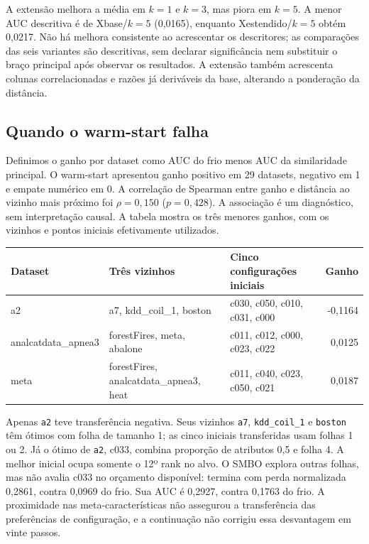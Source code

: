 \documentclass[10pt,a4paper]{article}
\begin{document}
A extensão melhora a média em $k=1$ e $k=3$, mas piora em $k=5$. A menor AUC descritiva é de Xbase/$k=5$ (0,0165), enquanto Xestendido/$k=5$ obtém 0,0217. Não há melhora consistente ao acrescentar os descritores; as comparações das seis variantes são descritivas, sem declarar significância nem substituir o braço principal após observar os resultados. A extensão também acrescenta colunas correlacionadas e razões já deriváveis da base, alterando a ponderação da distância.

\subsection{Quando o warm-start falha}
Definimos o ganho por dataset como AUC do frio menos AUC da similaridade principal. O warm-start apresentou ganho positivo em 29 datasets, negativo em 1 e empate numérico em 0. A correlação de Spearman entre ganho e distância ao vizinho mais próximo foi $\rho=0,150$ ($p=0,428$). A associação é um diagnóstico, sem interpretação causal. A tabela mostra os três menores ganhos, com os vizinhos e pontos iniciais efetivamente utilizados.

\begin{center}\scriptsize
\begin{tabularx}{\linewidth}{lYYr}
\toprule
Dataset & Três vizinhos & Cinco configurações iniciais & Ganho \\
\midrule
a2 & a7, kdd\_coil\_1, boston & c030, c050, c010, c031, c000 & -0,1164 \\
analcatdata\_apnea3 & forestFires, meta, abalone & c011, c012, c000, c023, c022 & 0,0125 \\
meta & forestFires, analcatdata\_apnea3, heat & c011, c040, c023, c050, c021 & 0,0187 \\
\bottomrule
\end{tabularx}
\end{center}

Apenas \texttt{a2} teve transferência negativa. Seus vizinhos \texttt{a7}, \texttt{kdd\_coil\_1} e \texttt{boston} têm ótimos com folha de tamanho 1; as cinco iniciais transferidas usam folhas 1 ou 2. Já o ótimo de \texttt{a2}, c033, combina proporção de atributos 0,5 e folha 4. A melhor inicial ocupa somente o 12º rank no alvo. O SMBO explora outras folhas, mas não avalia c033 no orçamento disponível: termina com perda normalizada 0,2861, contra 0,0969 do frio. Sua AUC é 0,2927, contra 0,1763 do frio. A proximidade nas meta-características não assegurou a transferência das preferências de configuração, e a continuação não corrigiu essa desvantagem em vinte passos.
\end{document}
